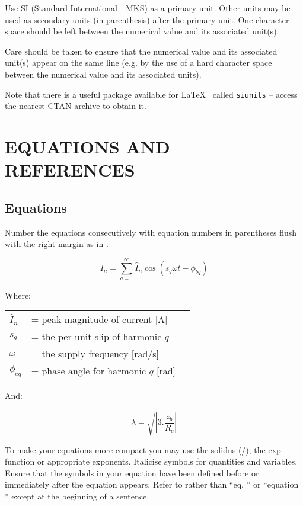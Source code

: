 \documentclass[10pt,twocolumn]{witseiepaper}
\begin{document}
Use SI (Standard International - MKS) as a primary unit.  Other units may be
used as secondary units (in parenthesis) after the primary unit. One character
space should be left between the numerical value and its associated unit(s).

Care should be taken to ensure that the numerical value and its associated
unit(s) appear on the same line (e.g. by the use of a hard character space
between the numerical value and its associated units).

Note that there is a useful package available for \LaTeX~ called \verb|siunits|
-- access the nearest CTAN archive to obtain it.

%
\section{EQUATIONS AND REFERENCES}

\subsection{Equations}

Number the equations consecutively with equation numbers in parentheses flush
with the right margin as in .

\begin{equation}
    I_n = \sum\limits_{q=1}^\infty \hat{I}_{n} \cos (s_q\omega t - \phi_{bq})
    \label{eqn:In}
\end{equation}

Where:

\begin{tabular}{lll}
$\hat{I}_{n}$  & = peak magnitude of current [A] \\
$s_{q}$        & = the per unit slip of harmonic $q$ \\
$\omega$       & = the supply frequency [rad/s] \\
$\phi_{eq} $   & = phase angle for harmonic $q$ [rad] \\
\end{tabular}

And:

\begin{equation}
    \lambda = \sqrt{\left|3.\frac{z_b}{R_c}\right|}
    \label{eqn:lambda}
\end{equation}


To make your equations more compact you may use the solidus (/), the exp
function or appropriate exponents.  Italicise symbols for quantities and
variables. Ensure that the symbols in your equation have been defined before or
immediately after the equation appears. Refer to  rather than ``eq. '' or
``equation '' except at the beginning of a sentence.
\end{document}
